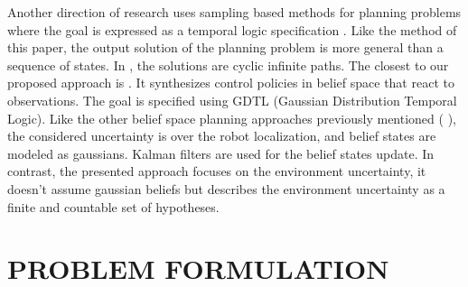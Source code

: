 \documentclass[letterpaper, 10 pt, conference]{ieeeconf}  %
\begin{document}
Another direction of research uses sampling based methods for planning problems where the goal is expressed as a temporal logic specification \cite{karaman2009sampling} \cite{leahy2019control} \cite{vasile2020reactive}. Like the method of this paper, the output solution of the planning problem is more general than a sequence of states. In \cite{karaman2009sampling} \cite{vasile2020reactive}, the solutions are cyclic infinite paths. The closest to our proposed approach is \cite{leahy2019control}. It synthesizes control policies in belief space that react to observations. The goal is specified using GDTL (Gaussian Distribution Temporal Logic). Like the other belief space planning approaches previously mentioned (\cite{prentice2010belief} \cite{bry2011rapidly}), the considered uncertainty is over the robot localization, and belief states are modeled as gaussians. Kalman filters are used for the belief states update. In contrast, the presented approach focuses on the environment uncertainty, it doesn't assume gaussian beliefs but describes the environment uncertainty as a finite and countable set of hypotheses.







\section{PROBLEM FORMULATION}
\end{document}

